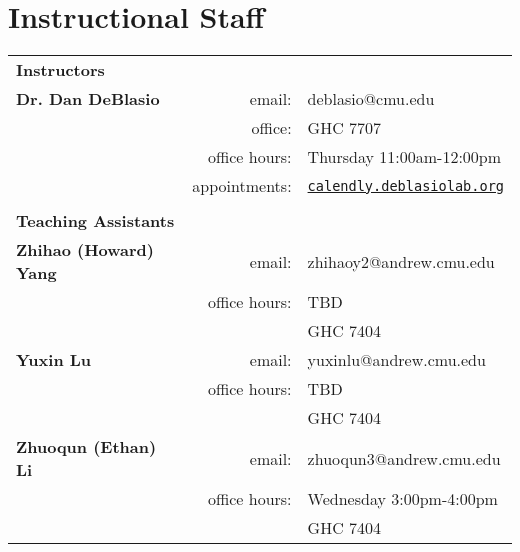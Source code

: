 \section{Instructional Staff}

\begin{tabular}{lrl}
\multicolumn{3}{l}{\Large \textbf{Instructors}}\vspace{0.75em}\\
\textbf{Dr. Dan DeBlasio}  
 & email: & deblasio@cmu.edu\\
 & office: & GHC 7707\\
& office hours:& Thursday 11:00am-12:00pm \\
& appointments: & \href{http://calendly.deblasiolab.org}{\texttt{calendly.deblasiolab.org}} \vspace{0.5em}\\

\\
\multicolumn{3}{l}{\Large \textbf{Teaching Assistants}}\vspace{0.75em}\\
%
\textbf{Zhihao (Howard) Yang}
 & email: & zhihaoy2@andrew.cmu.edu\\
 & office hours:& TBD\\
 && GHC 7404 \vspace{1em}\\

\textbf{Yuxin Lu}
 & email: & yuxinlu@andrew.cmu.edu\\
 & office hours:& TBD\\
 && GHC 7404\vspace{1em}\\

\textbf{Zhuoqun (Ethan) Li}
 & email: & zhuoqun3@andrew.cmu.edu\\
 & office hours:& Wednesday 3:00pm-4:00pm \\
 && GHC 7404\\



\end{tabular}
